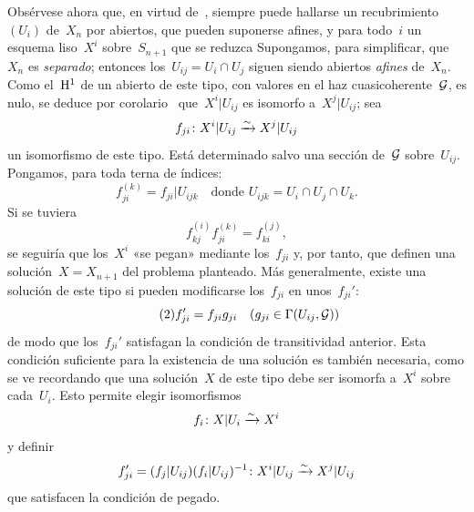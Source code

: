 Obsérvese ahora que, en virtud de~, siempre puede hallarse un recubrimiento~$(U_i)$
de~$X_n$ por abiertos, que pueden suponerse afines, y para todo~$i$ un esquema liso~$X^i$ sobre~$S_{n+1}$ que se reduzca
Supongamos, para simplificar, que~$X_n$ es \emph{separado}; entonces los~$U_{ij}=U_i\cap U_j$ siguen siendo abiertos \emph{afines} de~$X_n$. Como el~$\H^1$ de un abierto de este tipo, con valores en el haz cuasicoherente~$\cal{G}$, es nulo, se deduce por
corolario~ que~$X^i|U_{ij}$ es isomorfo a~$X^j|U_{ij}$; sea
$$
f_{ji}\colon X^i|U_{ij}\isomto X^j|U_{ij}
$$
un isomorfismo de este tipo. Está determinado salvo una sección de~$\cal{G}$ sobre~$U_{ij}$.
Pongamos, para toda terna de índices:
$$
f_{ji}^{(k)}=f_{ji}|U_{ijk}\quad\text{donde }U_{ijk}=U_i\cap U_j\cap U_k.
$$
Si se tuviera
\begin{equation*}
\label{eq:III.6.1}
\tag{1} {f_{kj}^{(i)}f_{ji}^{(k)}=f_{ki}^{(j)},}
\end{equation*}
se seguiría que los~$X^i$ «se pegan» mediante los~$f_{ji}$ y, por tanto, que definen una solución~$X=X_{n+1}$ del problema planteado. Más generalmente, existe una solución de este tipo si pueden modificarse los~$f_{ji}$ en unos~$f_{ji}'$:
\begin{equation*}
\label{eq:III.6.2}
\tag{2} {f_{ji}'=f_{ji}g_{ji}\quad (g_{ji}\in\Gamma(U_{ij},\cal{G}))}
\end{equation*}
de modo que los~$f_{ji}'$ satisfagan la condición de transitividad anterior. Esta condición suficiente para la existencia de una solución es también necesaria, como se ve recordando que una solución~$X$ de este tipo debe ser isomorfa a~$X^i$ sobre cada~$U_i$. Esto permite elegir isomorfismos
$$
f_i\colon X|U_i\isomto X^i
$$
y definir
$$
f_{ji}'=(f_j|U_{ij})(f_i|U_{ij})^{-1}\colon X^i|U_{ij}\isomto X^j|U_{ij}
$$
que satisfacen la condición de pegado.

